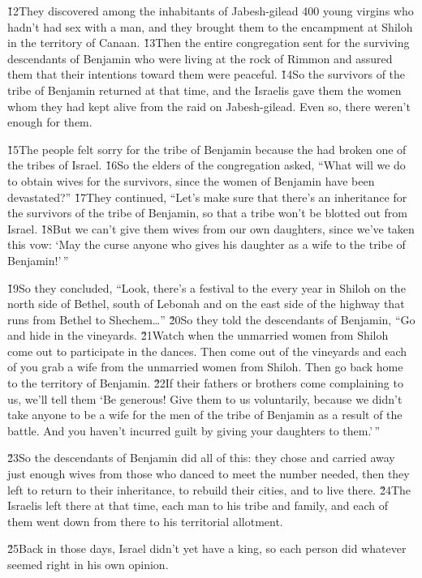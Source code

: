 \v{12}They discovered among the inhabitants of Jabesh-gilead 400 young virgins who hadn't had sex with a man, and they brought them to the encampment at Shiloh in the territory of Canaan. \v{13}Then the entire congregation sent for the surviving descendants of Benjamin who were living at the rock of Rimmon and assured them that their intentions toward them were peaceful. \v{14}So the survivors of the tribe of Benjamin returned at that time, and the Israelis gave them the women whom they had kept alive from the raid on Jabesh-gilead. Even so, there weren't enough for them.

\v{15}The people felt sorry for the tribe of Benjamin because the  had broken one of the tribes of Israel. \v{16}So the elders of the congregation asked, ``What will we do to obtain wives for the survivors, since the women of Benjamin have been devastated?'' \v{17}They continued, ``Let's make sure that there's an inheritance for the survivors of the tribe of Benjamin, so that a tribe won't be blotted out from Israel. \v{18}But we can't give them wives from our own daughters, since we've taken this vow: `May the  curse anyone who gives his daughter as a wife to the tribe of Benjamin!'\,''

\v{19}So they concluded, ``Look, there's a festival to the  every year in Shiloh on the north side of Bethel, south of Lebonah and on the east side of the highway that runs from Bethel to Shechem{\ldots}'' \v{20}So they told the descendants of Benjamin, ``Go and hide in the vineyards. \v{21}Watch when the unmarried women from Shiloh come out to participate in the dances. Then come out of the vineyards and each of you grab a wife from the unmarried women from Shiloh. Then go back home to the territory of Benjamin. \v{22}If their fathers or brothers come complaining to us, we'll tell them `Be generous! Give them to us voluntarily, because we didn't take anyone to be a wife for the men of the tribe of Benjamin as a result of the battle. And you haven't incurred guilt by giving your daughters to them.'\,''

\v{23}So the descendants of Benjamin did all of this: they chose and carried away just enough wives from those who danced to meet the number needed, then they left to return to their inheritance, to rebuild their cities, and to live there. \v{24}The Israelis left there at that time, each man to his tribe and family, and each of them went down from there to his territorial allotment.

\v{25}Back in those days, Israel didn't yet have a king, so each person did whatever seemed right in his own opinion.
